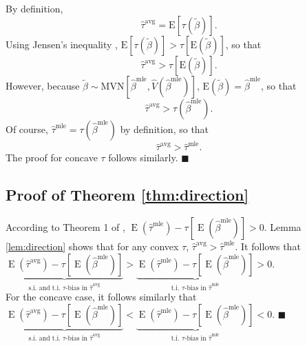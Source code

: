 \documentclass[12pt]{article}
\newenvironment{proof}[1][Proof]{\begin{trivlist}
\item[\hskip \labelsep {\bfseries #1}]}{\end{trivlist}}
\DeclareMathOperator*{\E}{\text{E}}
\begin{document}
\begin{proof}
By definition, $$ \hat{\tau}^{\text{avg}} = \text{E}\left[ \tau \left(\tilde{\beta} \right) \right].$$
Using Jensen's inequality \citep[p.\@ 190, Thm.\@ 4.7.7]{CasellaBerger2002}, $\text{E}\left[ \tau \left(\tilde{\beta} \right) \right] > \tau \left[ \text{E}\left( \tilde{\beta} \right) \right]$, so that $$\hat{\tau}^{\text{avg}} > \tau \left[ \text{E}\left( \tilde{\beta} \right) \right].$$
However, because $\tilde{\beta} \sim \text{MVN} \left[ \hat{\beta}^{\text{mle}}, \hat{V} \left( \hat{\beta}^{\text{mle}} \right) \right]$, $\text{E}\left( \tilde{\beta} \right) = \hat{\beta}^\text{mle}$, so that
$$\hat{\tau}^{\text{avg}} > \tau \left( \hat{\beta}^\text{mle}\right).$$
Of course, $\hat{\tau}^\text{mle} = \tau \left( {\hat{\beta}^\text{mle}} \right)$ by definition, so that $$\hat{\tau}^{\text{avg}} > \hat{\tau}^\text{mle}.$$
The proof for concave $\tau$ follows similarly.
 $\blacksquare$
\end{proof}

\subsection{Proof of Theorem \ref{thm:direction}}

\begin{proof}
According to Theorem 1 of \citet[p.\@ 405]{Rainey2017}, $\E \left( \hat{\tau}^\text{mle}\right) -  \tau \left[\E \left( \hat{\beta}^\text{mle} \right) \right] > 0$.
Lemma \ref{lem:direction} shows that for any convex $\tau$, $\hat{\tau}^{\text{avg}} > \hat{\tau}^\text{mle}$.
It follows that $\underbrace{\E \left( \hat{\tau}^\text{avg}\right) - \tau \left[\E \left( \hat{\beta}^\text{mle} \right) \right]}_{\text{s.i. and t.i. } \tau\text{-bias in }\hat{\tau}^{\text{avg}}} > \underbrace{\E \left( \hat{\tau}^\text{mle}\right) -  \tau \left[\E \left( \hat{\beta}^\text{mle} \right) \right]}_{\text{t.i. } \tau\text{-bias in }\hat{\tau}^{\text{mle}}} > 0$.\\

\noindent For the concave case, it follows similarly that $\underbrace{\E \left( \hat{\tau}^\text{avg}\right) - \tau \left[\E \left( \hat{\beta}^\text{mle} \right) \right]}_{\text{s.i. and t.i. } \tau\text{-bias in }\hat{\tau}^{\text{avg}}} < \underbrace{\E \left( \hat{\tau}^\text{mle}\right) -  \tau \left[\E \left( \hat{\beta}^\text{mle} \right) \right]}_{\text{t.i. } \tau\text{-bias in }\hat{\tau}^{\text{mle}}} < 0$.
 $\blacksquare$
\end{proof}
\end{document}
